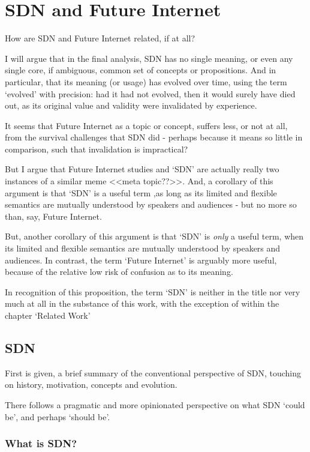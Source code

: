 \chapter{SDN and Future Internet}
How are SDN and Future Internet related, if at all?

I will argue that in the final analysis, SDN has no single meaning, or even any single core, if ambiguous, common set of concepts or propositions.  And in particular, that its meaning (or usage) has evolved over time, using the term `evolved' with precision: had it had not evolved, then it would surely have died out, as its original value and validity were invalidated by experience.

It seems that Future Internet as a topic or concept, suffers less, or not at all, from the survival challenges that SDN did - perhaps because it means so little in comparison, such that invalidation is impractical?

But I argue that Future Internet studies and `SDN' are actually really two instances of a similar meme <<meta topic??>>.
And, a corollary of this argument is that `SDN' is a useful term ,as long as its limited and flexible semantics are mutually understood by speakers and audiences - but no more so than, say, Future Internet.

But, another corollary of this argument is that `SDN' is \textit{only} a useful term, when its limited and flexible semantics are mutually understood by speakers and audiences.  In contrast, the term `Future Internet' is arguably more useful, because of the relative low risk of confusion as to its meaning.

In recognition of this proposition, the term `SDN' is neither in the title nor very much at all in the substance of this work, with the exception of within the chapter `Related Work'

\section{SDN}
First is given, a brief summary of the conventional perspective of SDN, touching on history, motivation, concepts and evolution.

There follows a pragmatic and more opinionated perspective on what SDN `could be', and perhaps `should be'.


\subsection{What is SDN?}
